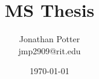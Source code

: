 \documentclass{article}
\theoremstyle{plain}
\theoremstyle{definition}
\theoremstyle{remark}
\theoremstyle{customtheoremstyle}
\begin{document}
\title{MS Thesis}
\author{Jonathan Potter \\ jmp2909@rit.edu}
\date{\today}
\maketitle







\end{document}
